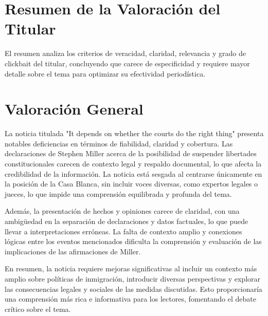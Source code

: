 \documentclass[10pt,a4paper]{article}
\begin{document}
\section*{Resumen de la Valoración del Titular}
    El resumen analiza los criterios de veracidad, claridad, relevancia y grado de clickbait del titular, concluyendo que carece de especificidad y requiere mayor detalle sobre el tema para optimizar su efectividad period\'{i}stica.
\vspace{1em}

\section*{Valoración General}
    La noticia titulada "It depends on whether the courts do the right thing" presenta notables deficiencias en t\'{e}rminos de fiabilidad, claridad y cobertura. Las declaraciones de Stephen Miller acerca de la posibilidad de suspender libertades constitucionales carecen de contexto legal y respaldo documental, lo que afecta la credibilidad de la informaci\'{o}n. La noticia est\'{a} sesgada al centrarse \'{u}nicamente en la posici\'{o}n de la Casa Blanca, sin incluir voces diversas, como expertos legales o jueces, lo que impide una comprensi\'{o}n equilibrada y profunda del tema.
\par\medskip
Adem\'{a}s, la presentaci\'{o}n de hechos y opiniones carece de claridad, con una ambig\"{u}edad en la separaci\'{o}n de declaraciones y datos factuales, lo que puede llevar a interpretaciones err\'{o}neas. La falta de contexto amplio y conexiones l\'{o}gicas entre los eventos mencionados dificulta la comprensi\'{o}n y evaluaci\'{o}n de las implicaciones de las afirmaciones de Miller.
\par\medskip
En resumen, la noticia requiere mejoras significativas al incluir un contexto m\'{a}s amplio sobre pol\'{i}ticas de inmigraci\'{o}n, introducir diversas perspectivas y explorar las consecuencias legales y sociales de las medidas discutidas. Esto proporcionar\'{i}a una comprensi\'{o}n m\'{a}s rica e informativa para los lectores, fomentando el debate cr\'{i}tico sobre el tema.
\vspace{1em}

\end{document}
